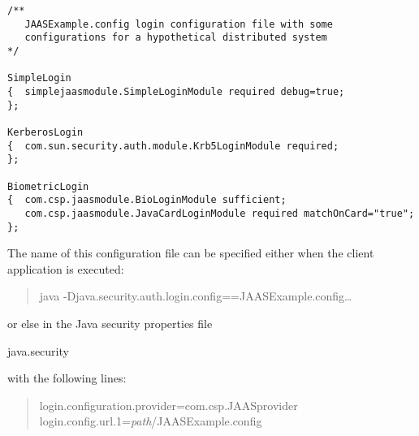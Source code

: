 \begin{program}\begin{verbatim}
/**
   JAASExample.config login configuration file with some
   configurations for a hypothetical distributed system
*/

SimpleLogin
{  simplejaasmodule.SimpleLoginModule required debug=true;
};

KerberosLogin
{  com.sun.security.auth.module.Krb5LoginModule required;
};

BiometricLogin
{  com.csp.jaasmodule.BioLoginModule sufficient;
   com.csp.jaasmodule.JavaCardLoginModule required matchOnCard="true";
};
\end{verbatim}\end{program}

\noindent
The name of this configuration file can be specified either when the
client application is executed:
\begin{quote}\begin{code}
java -Djava.security.auth.login.config==JAASExample.config\dots
\end{code}\end{quote}
or else in the Java security properties file \begin{code}java.security\end{code}
with the following lines:
\begin{quote}\begin{code}
login.configuration.provider=com.csp.JAASprovider \\
login.config.url.1=\emph{path}/JAASExample.config
\end{code}\end{quote}

